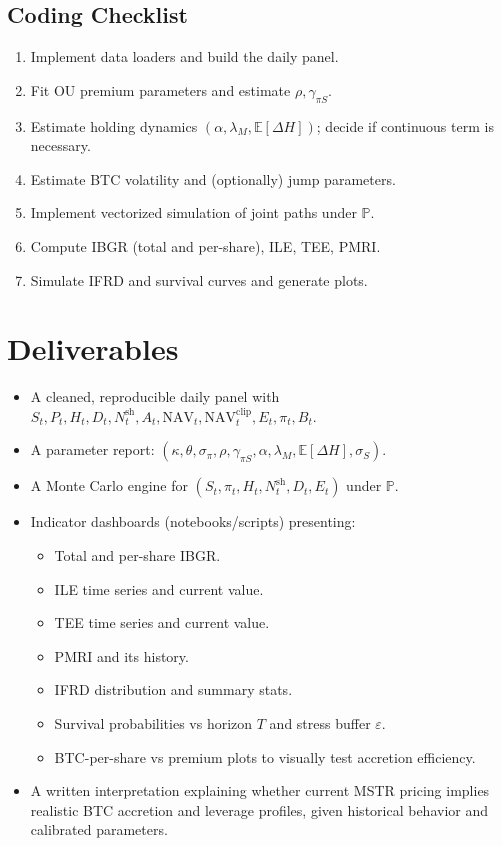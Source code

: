 \documentclass[11pt]{article}
\begin{document}
\subsection{Coding Checklist}

\begin{enumerate}
  \item Implement data loaders and build the daily panel.
  \item Fit OU premium parameters and estimate $\rho,\gamma_{\pi S}$.
  \item Estimate holding dynamics $(\alpha,\lambda_M,\mathbb E[\Delta H])$; decide if continuous term is necessary.
  \item Estimate BTC volatility and (optionally) jump parameters.
  \item Implement vectorized simulation of joint paths under $\mathbb P$.
  \item Compute IBGR (total and per-share), ILE, TEE, PMRI.
  \item Simulate IFRD and survival curves and generate plots.
\end{enumerate}

\section{Deliverables}

\begin{itemize}
  \item A cleaned, reproducible daily panel with $S_t,P_t,H_t,D_t,N_t^{\text{sh}},A_t,\text{NAV}_t,\text{NAV}_t^{\text{clip}},E_t,\pi_t,B_t$.
  \item A parameter report: $(\kappa,\theta,\sigma_\pi,\rho,\gamma_{\pi S},\alpha,\lambda_M,\mathbb E[\Delta H],\sigma_S)$.
  \item A Monte Carlo engine for $(S_t,\pi_t,H_t,N_t^{\text{sh}},D_t,E_t)$ under $\mathbb P$.
  \item Indicator dashboards (notebooks/scripts) presenting:
  \begin{itemize}
    \item Total and per-share IBGR.
    \item ILE time series and current value.
    \item TEE time series and current value.
    \item PMRI and its history.
    \item IFRD distribution and summary stats.
    \item Survival probabilities vs horizon $T$ and stress buffer $\varepsilon$.
    \item BTC-per-share vs premium plots to visually test accretion efficiency.
  \end{itemize}
  \item A written interpretation explaining whether current MSTR pricing implies realistic BTC accretion and leverage profiles, given historical behavior and calibrated parameters.
\end{itemize}
\end{document}
